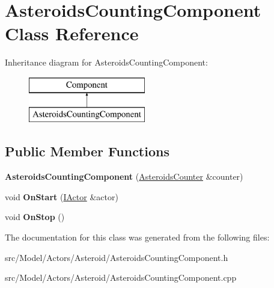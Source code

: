 \hypertarget{classAsteroidsCountingComponent}{}\section{Asteroids\+Counting\+Component Class Reference}
\label{classAsteroidsCountingComponent}
Inheritance diagram for Asteroids\+Counting\+Component\+:\begin{figure}[H]
\begin{center}
\leavevmode
\includegraphics[height=2.000000cm]{classAsteroidsCountingComponent}
\end{center}
\end{figure}
\subsection*{Public Member Functions}
\begin{DoxyCompactItemize}
\item 
{\bfseries Asteroids\+Counting\+Component} (\hyperlink{classAsteroidsCounter}{Asteroids\+Counter} \&counter)\hypertarget{classAsteroidsCountingComponent_aad10e1a5d7b29532820776f9926ce06a}{}\label{classAsteroidsCountingComponent_aad10e1a5d7b29532820776f9926ce06a}

\item 
void {\bfseries On\+Start} (\hyperlink{classIActor}{I\+Actor} \&actor)\hypertarget{classAsteroidsCountingComponent_a47c91c7b22a9223f39c065e615d41dda}{}\label{classAsteroidsCountingComponent_a47c91c7b22a9223f39c065e615d41dda}

\item 
void {\bfseries On\+Stop} ()\hypertarget{classAsteroidsCountingComponent_a08b48b1f45fa415be8148dbc515f0248}{}\label{classAsteroidsCountingComponent_a08b48b1f45fa415be8148dbc515f0248}

\end{DoxyCompactItemize}


The documentation for this class was generated from the following files\+:\begin{DoxyCompactItemize}
\item 
src/\+Model/\+Actors/\+Asteroid/Asteroids\+Counting\+Component.\+h\item 
src/\+Model/\+Actors/\+Asteroid/Asteroids\+Counting\+Component.\+cpp\end{DoxyCompactItemize}
